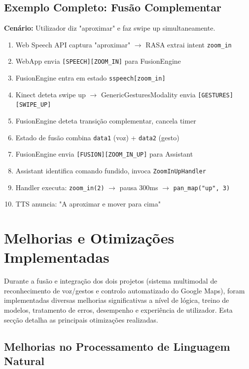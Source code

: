 \documentclass{report}
\begin{document}
\subsection{Exemplo Completo: Fusão Complementar}

\noindent \textbf{Cenário:} Utilizador diz "aproximar" e faz swipe up simultaneamente.

\begin{enumerate}
    \item Web Speech API captura "aproximar" $\rightarrow$ RASA extrai intent \texttt{zoom\_in}
    \item WebApp envia \texttt{[SPEECH][ZOOM\_IN]} para FusionEngine
    \item FusionEngine entra em estado \texttt{sspeech[zoom\_in]}
    \item Kinect deteta swipe up $\rightarrow$ GenericGesturesModality envia \texttt{[GESTURES][SWIPE\_UP]}
    \item FusionEngine deteta transição complementar, cancela timer
    \item Estado de fusão combina \texttt{data1} (voz) + \texttt{data2} (gesto)
    \item FusionEngine envia \texttt{[FUSION][ZOOM\_IN\_UP]} para Assistant
    \item Assistant identifica comando fundido, invoca \texttt{ZoomInUpHandler}
    \item Handler executa: \texttt{zoom\_in(2)} $\rightarrow$ pausa 300ms $\rightarrow$ \texttt{pan\_map("up", 3)}
    \item TTS anuncia: "A aproximar e mover para cima"
\end{enumerate}

\section{Melhorias e Otimizações Implementadas}

Durante a fusão e integração dos dois projetos (sistema multimodal de reconhecimento de voz/gestos e controlo automatizado do Google Maps), foram implementadas diversas melhorias significativas a nível de lógica, treino de modelos, tratamento de erros, desempenho e experiência de utilizador. Esta secção detalha as principais otimizações realizadas.

\subsection{Melhorias no Processamento de Linguagem Natural}
\end{document}
